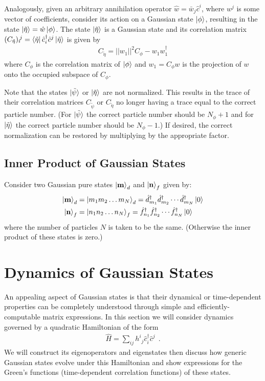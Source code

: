 \documentclass[aps, superscriptaddress, floatfix, onecolumn]{revtex4-2}
\begin{document}
Analogously, given an arbitrary annihilation operator $\hat{w} = \bar{w}_j \hat{c}^i$, where $w^j$ is some vector of coefficients, consider its action on a Gaussian state $\ket{\phi}$, resulting in the state $\ket{\tilde{\eta}} = \hat{w} \ket{\phi}$.
The state $\ket{\tilde{\eta}}$ is a Gaussian state and its correlation matrix $( C_{\tilde{\eta}})_i\!^j = \bra{\tilde{\eta}} \hat{c}^\dagger_i \hat{c}^j \ket{\tilde{\eta}}$  is given by 
\begin{align}
\boxed{C_{\tilde{\eta}} = ||w_1||^2 C_\phi - w_1 w_1^\dagger}
\end{align}
where $C_\phi$ is the correlation matrix of $\ket{\phi}$ and $w_1 = C_\phi w$ is the projection of $w$ onto the occupied subspace of $C_\phi$.

Note that the states $\ket{\tilde{\psi}}$ or $\ket{\tilde{\eta}}$ are not normalized. This results in the trace of their correlation matrices $C_{\tilde{\psi}}$ or $C_{\tilde{\eta}}$ no longer having a trace equal to the correct particle number. (For $\ket{\tilde{\psi}}$ the correct particle number should be $N_\phi + 1$ and for $\ket{\tilde{\eta}}$ the correct particle number should be $N_\phi-1$.) If desired, the correct normalization can be restored by multiplying by the appropriate factor.


\subsection{Inner Product of Gaussian States}

Consider two Gaussian pure states $\ket{\mathbf{m}}_d$ and $\ket{\mathbf{n}}_f$ given by:
\begin{align}
\ket{\mathbf{m}}_d & = \ket{m_1 m_2 \ldots m_{N}}_d = \hat{d}^\dagger_{m_1} \hat{d}^\dagger_{m_2} \cdots \hat{d}^\dagger_{m_{N}} \ket{0} \\
\ket{\mathbf{n}}_f & = \ket{n_1 n_2 \ldots n_{N}}_f = \hat{f}^\dagger_{n_1} \hat{f}^\dagger_{n_2} \cdots \hat{f}^\dagger_{n_{N}} \ket{0} \\
\end{align}
where the number of particles $N$ is taken to be the same. (Otherwise the inner product of these states is zero.)


\section{Dynamics of Gaussian States}

An appealing aspect of Gaussian states is that their dynamical or time-dependent properties can be completely understood through simple and efficiently- computable matrix expressions. In this section we will consider dynamics governed by a quadratic Hamiltonian of the form 
\begin{align}
\hat{H} = \sum_{ij} h^i\!_j \hat{c}^\dagger_i \hat{c}^j \ \ .
\end{align} 
We will construct its eigenoperators and eigenstates then discuss how generic Gaussian states evolve under this Hamiltonian and show expressions for the Green's functions (time-dependent correlation functions) of these states.
\end{document}
